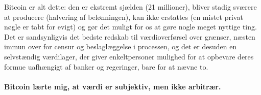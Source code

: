 Bitcoin er alt dette: den er ekstremt sjælden (21 millioner), bliver stadig sværere at producere (halvering af belønningen), kan ikke erstattes (en mistet privat nøgle er tabt for evigt) og gør det muligt for os at gøre nogle meget nyttige ting. Det er sandsynligvis det bedste redskab til værdioverførsel over grænser, næsten immun over for censur og beslaglæggelse i processen, og det er desuden en selvstændig værdilager, der giver enkeltpersoner mulighed for at opbevare deres formue uafhængigt af banker og regeringer, bare for at nævne to.

\paragraph{Bitcoin lærte mig, at værdi er subjektiv, men ikke arbitrær.}

%
%
%
%
